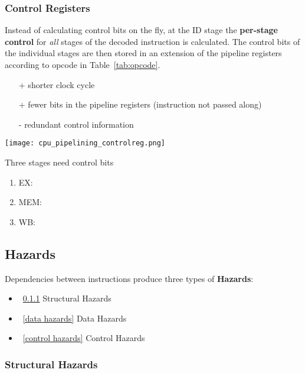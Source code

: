\subsubsection{Control Registers}
Instead of calculating control bits on the fly, at the ID stage the \textbf{per-stage control} for \textit{all} stages of the decoded instruction is calculated.
The control bits of the individual stages are then stored in an extension of the pipeline registers according to opcode in Table~\ref{tab:opcode}.
\begin{itemize}
    \item[+] shorter clock cycle
    \item[+] fewer bits in the pipeline registers (instruction not passed along)
    \item[-] redundant control information
\end{itemize}

\begin{center}
    \texttt{[image: cpu\_pipelining\_controlreg.png]}
\end{center}

Three stages need control bits
\begin{enumerate}
    \item EX: 
    \item MEM: 
    \item WB: 
\end{enumerate}

\subsection{Hazards}
Dependencies between instructions produce three types of \textbf{Hazards}:
\begin{itemize}
    \item~\ref{structural hazards} Structural Hazards
    \item~\ref{data hazards} Data Hazards
    \item~\ref{control hazards} Control Hazards
\end{itemize}

\subsubsection{Structural Hazards}\label{structural hazards}

